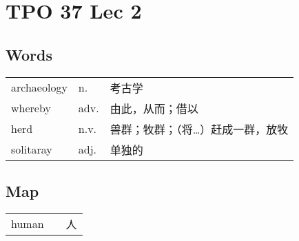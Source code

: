 \section{TPO 37 Lec 2}

\subsection{Words}

\begin{tabular}{lll}
    archaeology & n.   & 考古学               \\
    whereby     & adv. & 由此，从而；借以          \\
    herd        & n.v. & 兽群；牧群；（将…）赶成一群，放牧 \\
    solitaray   & adj. & 单独的               \\
\end{tabular}

\subsection{Map}

\begin{tabular}{rc@{\quad$\to$\quad}l}
    human &  & 人 \\
\end{tabular}
